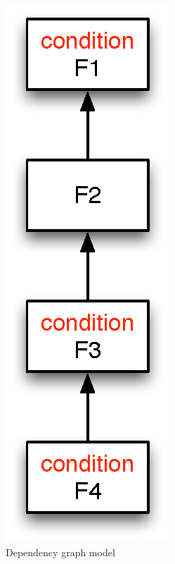 \begin{figure}[hb]
\begin{minipage}[b]{0.5\linewidth}
\centering
\includegraphics[scale=0.5]{depends_graph.eps}
\caption{Dependency graph model}
\label{fig:depends}
\end{minipage}
\hspace{0.5cm}
\begin{minipage}[b]{0.5\linewidth}
\centering

\end{minipage}
\end{figure}
